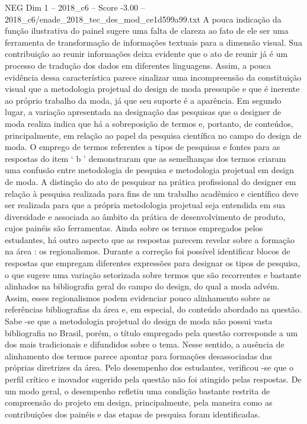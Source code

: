 \begin{textsample}{NEG Dim 1 – 2018\_c6 – Score -3.00 – 2018\_c6/enade\_2018\_tec\_des\_mod\_ce1d599a99.txt}
A pouca indicação da função ilustrativa do painel sugere uma falta de clareza ao fato de ele ser uma ferramenta de transformação de informações textuais para a dimensão visual.
Sua contribuição ao reunir informações deixa evidente que o ato de reunir já é um processo de tradução dos dados em diferentes linguagens.
Assim, a pouca evidência dessa característica parece sinalizar uma incompreensão da constituição visual que a metodologia projetual do design de moda pressupõe e que é inerente ao próprio trabalho da moda, já que seu suporte é a aparência.
Em segundo lugar, a variação apresentada na designação das pesquisas que o designer de moda realiza indica que há a sobreposição de termos e, portanto, de conteúdos, principalmente, em relação ao papel da pesquisa científica no campo do design de moda.
O emprego de termos referentes a tipos de pesquisas e fontes para as respostas do item ‘ b ’ demonstraram que as semelhanças dos termos criaram uma confusão entre metodologia de pesquisa e metodologia projetual em design de moda.
A distinção do ato de pesquisar na prática profissional do designer em relação à pesquisa realizada para fins de um trabalho acadêmico e científico deve ser realizada para que a própria metodologia projetual seja entendida em sua diversidade e associada ao âmbito da prática de desenvolvimento de produto, cujos painéis são ferramentas.
Ainda sobre os termos empregados pelos estudantes, há outro aspecto que as respostas parecem revelar sobre a formação na área : os regionalismos.
Durante a correção foi possível identificar blocos de respostas que empregam diferentes expressões para designar os tipos de pesquisa, o que sugere uma variação setorizada sobre termos que são recorrentes e bastante alinhados na bibliografia geral do campo do design, do qual a moda advém.
Assim, esses regionalismos podem evidenciar pouco alinhamento sobre as referências bibliografias da área e, em especial, do conteúdo abordado na questão.
Sabe -se que a metodologia projetual do design de moda não possui vasta bibliografia no Brasil, porém, o título empregado pela questão corresponde a um dos mais tradicionais e difundidos sobre o tema.
Nesse sentido, a ausência de alinhamento dos termos parece apontar para formações desassociadas das próprias diretrizes da área.
Pelo desempenho dos estudantes, verificou -se que o perfil crítico e inovador sugerido pela questão não foi atingido pelas respostas.
De um modo geral, o desempenho refletiu uma condição bastante restrita de compreensão do projeto em design, principalmente, pela maneira como as contribuições dos painéis e das etapas de pesquisa foram identificadas.

\end{textsample}
